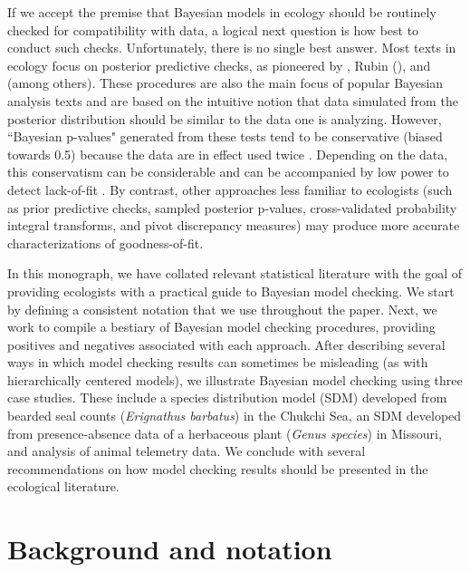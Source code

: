 \documentclass[12pt,english]{article}
\begin{document}
\begin{spacing}{1.9}
If we accept the premise that Bayesian models in ecology should be routinely checked for compatibility with data, a logical next question is how best to conduct such checks.  Unfortunately, there is no single best answer.  Most texts in ecology \citep[e.g.,][]{KingEtAl2009,LinkBarker2010,KerySchaub2012} focus on posterior predictive checks, as pioneered by \citet{Guttman1967}, Rubin (\citeyear{Rubin1981,Rubin1984}), and \citet{GelmanEtAl1996} (among others).  These procedures are also the main focus of popular Bayesian analysis texts \citep[e.g.,][]{CressieWikle2011,GelmanEtAl2014} and are based on the intuitive notion that data simulated from the posterior distribution should be similar to the data one is analyzing.  However, ``Bayesian p-values" generated from these tests tend to be conservative (biased towards 0.5) because the data are in effect used twice \citep[once to fit the model and once to test the model;][]{BayarriBerger2000,RobinsEtAl2000}.  Depending on the data, this conservatism can be considerable \citep[e.g.][]{Zhang2014} and can be accompanied by low power to detect lack-of-fit \citep{YuanJohnson2012,Zhang2014}. By contrast, other approaches less familiar to ecologists (such as prior predictive checks, sampled posterior p-values, cross-validated probability integral transforms, and pivot discrepancy measures) may produce more accurate characterizations of goodness-of-fit.

In this monograph, we have collated relevant statistical literature with the goal of providing ecologists with a practical guide to Bayesian model checking.  We start by defining a consistent notation that we use throughout the paper. Next, we work to compile a bestiary of Bayesian model checking procedures, providing positives and negatives associated with each approach.  After describing several ways in which model checking results can sometimes be misleading (as with hierarchically centered models), we illustrate Bayesian model checking using three case studies.  These include a species distribution model (SDM) developed from bearded seal counts (\textit{Erignathus barbatus}) in the Chukchi Sea, an SDM developed from presence-absence data of a herbaceous plant (\textit{Genus species}) in Missouri, and analysis of animal telemetry data.  We conclude with several recommendations on how model checking results should be presented in the ecological literature.



\section{Background and notation}


\end{spacing}
\end{document}
